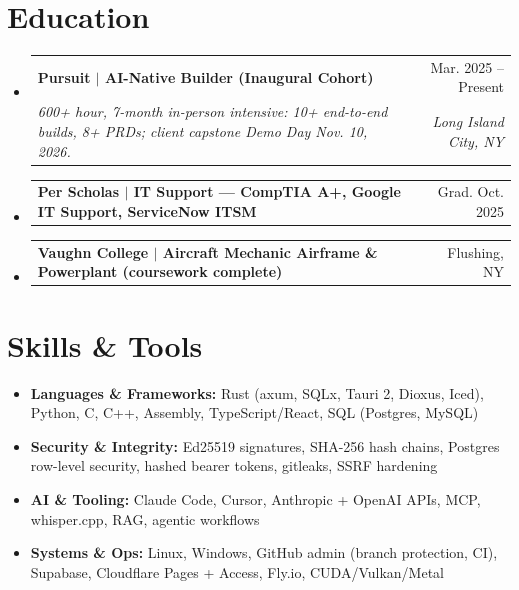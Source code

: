 \documentclass[letterpaper,10pt]{article}   %
\makeatletter
\newcommand{\resumeItem}[2]{
  \item\small{
    \textbf{#1}{#2 \vspace{-2pt}}
  }
}
\newcommand{\resumeSubheadingEd}[4]{
  \vspace{-1pt}\item
    \begin{tabular*}{0.97\textwidth}{l@{\extracolsep{\fill}}r}
      \textbf{#1} &  \small #2\\
      \textit{\small#3} & \textit{\small #4}\\
    \end{tabular*}\vspace{-5pt}
}
\newcommand{\resumeSubheadingShort}[2]{
  \vspace{-1pt}\item
    \begin{tabular*}{0.97\textwidth}{l@{\extracolsep{\fill}}r}
      \textbf{#1} & \small #2 \\
    \end{tabular*}\vspace{-5pt}
}
\newcommand{\resumeSubItem}[2]{\resumeItem{#1}{#2}\vspace{-4pt}}
\newcommand{\resumeSubHeadingListStart}{\begin{itemize}[leftmargin=*, label={}]}
\newcommand{\resumeSubHeadingListEnd}{\end{itemize}}
\makeatother
\begin{document}
\section{Education}
  \resumeSubHeadingListStart

    \resumeSubheadingEd
      {Pursuit $|$ AI-Native Builder (Inaugural Cohort)}{Mar. 2025 -- Present}
      {600+ hour, 7-month in-person intensive: 10+ end-to-end builds, 8+ PRDs; client capstone Demo Day Nov. 10, 2026.}{Long Island City, NY}
      \smallskip

    \resumeSubheadingShort
      {Per Scholas $|$ IT Support --- CompTIA A+, Google IT Support, ServiceNow ITSM}{Grad. Oct. 2025}

    \resumeSubheadingShort
      {Vaughn College $|$ Aircraft Mechanic Airframe \& Powerplant (coursework complete)}{Flushing, NY}

  \resumeSubHeadingListEnd

\section{Skills \& Tools}
 \resumeSubHeadingListStart
   \resumeSubItem{Languages \& Frameworks: }
     {Rust (axum, SQLx, Tauri 2, Dioxus, Iced), Python, C, C++, Assembly, TypeScript/React, SQL (Postgres, MySQL)}
   \resumeSubItem{Security \& Integrity: }
     {Ed25519 signatures, SHA-256 hash chains, Postgres row-level security, hashed bearer tokens, gitleaks, SSRF hardening}
   \resumeSubItem{AI \& Tooling: }
     {Claude Code, Cursor, Anthropic + OpenAI APIs, MCP, whisper.cpp, RAG, agentic workflows}
   \resumeSubItem{Systems \& Ops: }
     {Linux, Windows, GitHub admin (branch protection, CI), Supabase, Cloudflare Pages + Access, Fly.io, CUDA/Vulkan/Metal}
 \resumeSubHeadingListEnd
\end{document}
